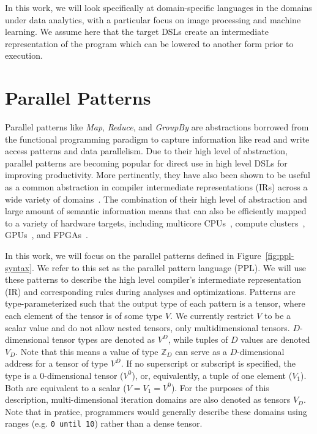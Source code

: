 In this work, we will look specifically at domain-specific languages in the domains under
data analytics, with a particular focus on image processing and machine learning.
We assume here that the target DSLs create an intermediate representation of the program
which can be lowered to another form prior to execution.


\section{Parallel Patterns}
\label{parallel-patterns}

Parallel patterns like \emph{Map}, \emph{Reduce}, and \emph{GroupBy} are abstractions
borrowed from the functional programming paradigm
to capture information like read and write access patterns and data parallelism.
Due to their high level of abstraction, parallel patterns are becoming
popular for direct use in high level DSLs for improving productivity.
More pertinently, they have also been shown to be useful as a common abstraction in compiler
intermediate representations (IRs) across a wide variety of domains~\cite{ecoop13sujeeth,pldi13halide}.
The combination of their high level of abstraction and large amount of semantic information
means that can also be efficiently mapped to a variety of hardware
targets, including multicore CPUs~\cite{scala,haskell,delite-tecs14},
compute clusters~\cite{mapreduce,zaharia10spark,spartan},
GPUs~\cite{catanzaro11copperhead,micro14lee},
and FPGAs~\cite{auerbach10lime,george14fpl}.



In this work, we will focus on the parallel patterns defined in Figure~\ref{fig:ppl-syntax}.
We refer to this set as the parallel pattern language (PPL).
We will use these patterns to describe the high level
compiler's intermediate representation (IR) and corresponding rules during analyses and optimizations.
Patterns are type-parameterized such that the output type of each pattern is a tensor, where each
element of the tensor is of some type $V$. We currently restrict $V$ to be a scalar value and
do not allow nested tensors, only multidimensional tensors.
$D$-dimensional tensor types are denoted as $V^D$, while tuples of $D$ values are
denoted $V_D$. Note that this means a value of type $\mathbb{Z}_D$ can serve as a $D$-dimensional address
for a tensor of type $V^D$.
If no superscript or subscript is specified, the type is a 0-dimensional tensor ($V^0$), or, equivalently, a tuple of one element ($V_1$).
Both are equivalent to a scalar ($V = V_1 = V^0$).
For the purposes of this description, multi-dimensional iteration domains are
also denoted as tensors $V_D$. Note that in pratice, programmers would generally
describe these domains using ranges (e.g. \texttt{0 until 10}) rather than a dense tensor.

